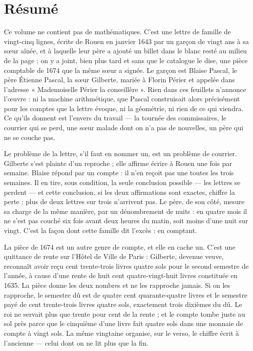 \documentclass[11pt,a4paper]{article}
\begin{document}
\section*{Résumé}

\begin{resume}
Ce volume ne contient pas de mathématiques. C'est une lettre de famille de
vingt-cinq lignes, écrite de Rouen en janvier 1643 par un garçon de vingt ans
à sa sœur aînée, et à laquelle leur père a ajouté un billet dans le blanc
resté au milieu de la page ; on y a joint, bien plus tard et sans que le
catalogue le dise, une pièce comptable de 1674 que la même sœur a signée. Le
garçon est Blaise Pascal, le père Étienne Pascal, la sœur Gilberte, mariée à
Florin Périer et appelée dans l'adresse « Mademoiselle Périer la
conseillère ». Rien dans ces feuillets n'annonce l'œuvre : ni la machine
arithmétique, que Pascal construisait alors précisément pour les comptes que
la lettre évoque, ni la géométrie, ni rien de ce qui viendra. Ce qu'ils
donnent est l'envers du travail — la tournée des commissaires, le courrier qui
se perd, une sœur malade dont on n'a pas de nouvelles, un père qui ne se
couche pas.

Le problème de la lettre, s'il faut en nommer un, est un problème de courrier.
Gilberte s'est plainte d'un reproche ; elle affirme écrire à Rouen une fois par
semaine. Blaise répond par un compte : il n'en reçoit pas une toutes les trois
semaines. Il en tire, sous condition, la seule conclusion possible — les
lettres se perdent — et cette conclusion, si les deux affirmations sont
exactes, chiffre la perte : plus de deux lettres sur trois n'arrivent pas.
Le père, de son côté, mesure sa charge de la même manière, par un dénombrement
de nuits : en quatre mois il ne s'est pas couché six fois avant deux heures du
matin, soit moins d'une nuit sur vingt. C'est la façon dont cette famille dit
l'excès : en comptant.

La pièce de 1674 est un autre genre de compte, et elle en cache un. C'est une
quittance de rente sur l'Hôtel de Ville de Paris : Gilberte, devenue veuve,
reconnaît avoir reçu cent trente-trois livres quatre sols pour le second
semestre de l'année, à cause d'une rente de huit cent quatre-vingt-huit livres
constituée en 1635. La pièce donne les deux nombres et ne les rapproche
jamais. Si on les rapproche, le semestre dû est de quatre cent quarante-quatre
livres et le semestre payé de cent trente-trois livres quatre sols, exactement
trois dixièmes du dû. Le roi ne servait plus que trente pour cent de la rente ;
et le compte tombe juste au sol près parce que le cinquième d'une livre fait
quatre sols dans une monnaie de compte à vingt sols. La même vingtaine
organise, sur le verso, le chiffre écrit à l'ancienne — celui dont on ne lit
plus que la fin.


\end{resume}
\end{document}
